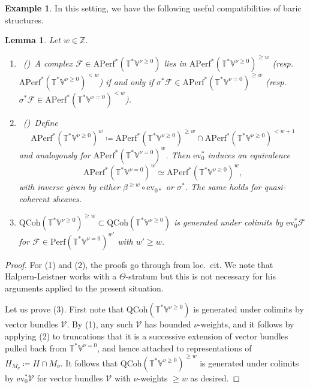 \documentclass{amsart}
\newtheorem{lemma}[theorem]{Lemma}
\theoremstyle{definition}
\newtheorem{example}[theorem]{Example}
\theoremstyle{remark}
\numberwithin{equation}{section}
\newcommand{\mc}{\mathcal}
\newcommand{\Z}{\mathbb{Z}}
\newcommand{\QCoh}{\mathrm{QCoh}}
\newcommand{\V}{\mathbb{V}}
\newcommand{\T}{\mathbb{T}}
\newcommand{\Perf}{\mathrm{Perf}}
\newcommand{\Aperf}{\mathrm{APerf}}
\newcommand{\ev}{\mathrm{ev}}
\begin{document}
\begin{example}{\label{ex: TVnugeq0}}
    In this setting, we have the following useful compatibilities of baric structures.
    \begin{lemma}{\label{lem: HLlemmas}}
    Let $w\in \Z$.
        \begin{enumerate}
            \item~(\cite[Lemma 1.5.4]{HalpernLeistner})~A complex $\mc{F} \in \Aperf^*(\T^{\ast}\V^{\nu \geq 0})$ lies in $\Aperf^*(\T^{\ast}\V^{\nu \geq 0})^{\geq w}$ (resp.~$\Aperf^*(\T^{\ast}\V^{\nu \geq 0})^{< w}$) if and only if $\sigma^{\ast} \mc{F} \in \Aperf^*(\T^{\ast}\V^{\nu = 0})^{\geq w}$ (resp.~$\sigma^{\ast} \mc{F} \in \Aperf^*(\T^{\ast}\V^{\nu = 0})^{< w}$).
            \item~(\cite[Lemma 1.5.6]{HalpernLeistner})~Define \[\Aperf^*(\T^{\ast}\V^{\nu \geq 0})^{w} \coloneq \Aperf^*(\T^{\ast}\V^{\nu \geq 0})^{\geq w} \cap \Aperf^*(\T^{\ast}\V^{\nu \geq 0})^{<w +1}\] and analogously for $\Aperf^*(\T^{\ast}\V^{\nu = 0})^{w}$. Then $\ev^{\ast}_0$ induces an equivalence
\begin{equation*}
    \Aperf^*(\T^{\ast}\V^{\nu = 0})^{w} \simeq \Aperf^*(\T^{\ast}\V^{\nu \geq 0})^{w},
\end{equation*}
with inverse given by either $\beta^{\geq w} \circ \ev_{0 \ast}$ or $\sigma^*$. The same holds for quasi-coherent sheaves.
    \item $\QCoh(\T^*\V^{\nu\geq 0})^{\geq w}\subset \QCoh(\T^*\V^{\nu\geq 0})$ is generated under colimits by $\ev_0^* \mc F$ for $\mc F\in \Perf(\T^*\V^{\nu=0})^{w'}$ with $w' \geq w$.  
        \end{enumerate}
    \end{lemma}
    \begin{proof}
        For (1) and (2), the proofs go through from loc.~cit. We note that Halpern-Leistner works with a $\Theta$-stratum but this is not necessary for his arguments applied to the present situation.

        Let us prove (3). First note that $\QCoh(\T^*\V^{\nu\geq 0})$ is generated under colimits by vector bundles $\mc V$. By (1), any such $\mc V$ has bounded $\nu$-weights, and it follows by applying (2) to truncations that it is a successive extension of vector bundles pulled back from $\T^*\V^{\nu=0}$, and hence attached to representations of $H_{M_\nu}\coloneq H\cap M_\nu$. It follows that $\QCoh(\T^*\V^{\nu\geq 0})^{\geq w}$ is generated under colimits by $\ev_0^{*} \mc V$ for vector bundles $\mc V$ with $\nu$-weights $\geq w$ as desired. 
    \end{proof}


\end{example}
\end{document}
